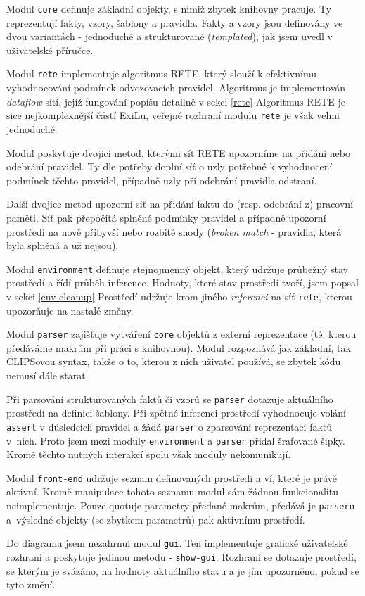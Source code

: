 Modul \verb|core| definuje základní objekty, s nimiž zbytek knihovny
pracuje. Ty reprezentují fakty, vzory, šablony a pravidla. Fakty a vzory jsou
definovány ve dvou variantách - jednoduché a strukturované (\emph{templated}),
jak jsem uvedl v uživatelské příručce.

Modul \verb|rete| implementuje algoritmus RETE, který slouží k efektivnímu
vyhodnocování podmínek odvozovacích pravidel. Algoritmus je implementován
\emph{dataflow} sítí, jejíž fungování popíšu detailně v sekci \ref{rete}
Algoritmus RETE je sice nejkomplexnější částí ExiLu, veřejné rozhraní modulu
\verb|rete| je však velmi jednoduché.

Modul poskytuje dvojici metod, kterými síť RETE upozorníme na přidání nebo
odebrání pravidel. Ty dle potřeby doplní síť o uzly potřebné k vyhodnocení
podmínek těchto pravidel, případně uzly při odebrání pravidla odstraní.

Další dvojice metod upozorní síť na přidání faktu do (resp. odebrání z) pracovní
paměti. Síť pak přepočítá splněné podmínky pravidel a případně upozorní
prostředí na nově přibyvší nebo rozbité shody (\emph{broken match} - pravidla,
která byla splněná a už nejsou).

Modul \verb|environment| definuje stejnojmenný objekt, který udržuje průbežný
stav prostředí a řídí průběh inference. Hodnoty, které stav prostředí tvoří,
jsem popsal v sekci \ref{env cleanup} Prostředí udržuje krom jiného
\emph{referenci} na síť \verb|rete|, kterou upozorňuje na nastalé změny.

Modul \verb|parser| zajišťuje vytváření \verb|core| objektů z externí
reprezentace (té, kterou předáváme makrům při práci s knihovnou). Modul
rozpoznává jak základní, tak CLIPSovou syntax, takže o to, kterou z nich
uživatel používá, se zbytek kódu nemusí dále starat.

Při parsování strukturovaných faktů či vzorů se \verb|parser| dotazuje
aktuálního prostředí na definici šablony. Při zpětné inferenci prostředí
vyhodnocuje volání \verb|assert| v důsledcích pravidel a žádá \verb|parser| o
zparsování reprezentací faktů v~nich. Proto jsem mezi moduly \verb|environment|
a \verb|parser| přidal šrafované šipky. Kromě těchto nutných interakcí spolu
však moduly nekomunikují.

Modul \verb|front-end| udržuje seznam definovaných prostředí a ví, které je
právě aktivní. Kromě manipulace tohoto seznamu modul sám žádnou funkcionalitu
neimplementuje. Pouze quotuje parametry předané makrům, předává je
\verb|parser|u a~výsledné objekty (se zbytkem parametrů) pak aktivnímu prostředí.

Do diagramu jsem nezahrnul modul \verb|gui|. Ten implementuje grafické
uživatelské rozhraní a poskytuje jedinou metodu - \verb|show-gui|. Rozhraní se
dotazuje prostředí, se kterým je svázáno, na hodnoty aktuálního stavu a je jím
upozorněno, pokud se tyto změní.
